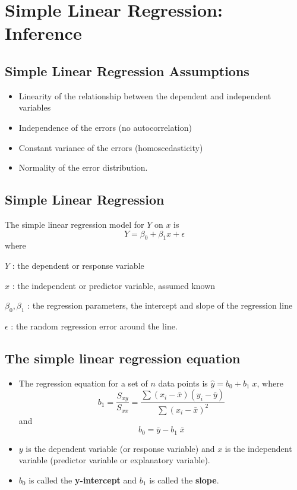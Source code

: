\documentclass[
]{article}
\author{}
\date{\vspace{-2.5em}}
\providecommand{\tightlist}{%
  \setlength{\itemsep}{0pt}\setlength{\parskip}{0pt}}
\begin{document}
\hypertarget{simple-linear-regression-inference}{%
\section{Simple Linear Regression:
Inference}\label{simple-linear-regression-inference}}

\hypertarget{simple-linear-regression-assumptions}{%
\subsection{Simple Linear Regression
Assumptions}\label{simple-linear-regression-assumptions}}

\begin{itemize}
\item
  Linearity of the relationship between the dependent and independent
  variables
\item
  Independence of the errors (no autocorrelation)
\item
  Constant variance of the errors (homoscedasticity)
\item
  Normality of the error distribution.
\end{itemize}

\hypertarget{simple-linear-regression}{%
\subsection{Simple Linear Regression}\label{simple-linear-regression}}

The simple linear regression model for \(Y\) on \(x\) is
\[Y=\beta_0+\beta_1 x+\epsilon\] where

\(Y\) : the dependent or response variable

\(x\) : the independent or predictor variable, assumed known

\(\beta_0,\beta_1\) : the regression parameters, the intercept and slope
of the regression line

\(\epsilon\) : the random regression error around the line.

\hypertarget{the-simple-linear-regression-equation}{%
\subsection{The simple linear regression
equation}\label{the-simple-linear-regression-equation}}

\begin{itemize}
\tightlist
\item
  The regression equation for a set of \(n\) data points is
  \(\hat{y}=b_0+b_1\;x\), where
  \[b_1=\frac{S_{xy}}{S_{xx}}=\frac{\sum (x_i-\bar{x})(y_i-\bar{y})}{\sum (x_i-\bar{x})^2}\]
  and \[b_0=\bar{y}-b_1\; \bar{x}\]
\item
  \(y\) is the dependent variable (or response variable) and \(x\) is
  the independent variable (predictor variable or explanatory variable).
\item
  \(b_0\) is called the \textbf{y-intercept} and \(b_1\) is called the
  \textbf{slope}.
\end{itemize}
\end{document}

